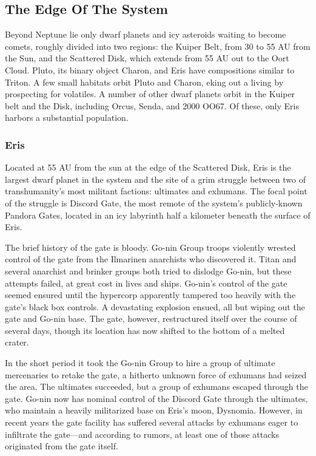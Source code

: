 \subsection{The Edge Of The System}

Beyond Neptune lie only dwarf planets and icy asteroids waiting to become comets, roughly divided into 
two regions: the Kuiper Belt, from 30 to 55 AU from 
the Sun, and the Scattered Disk, which extends from 
55 AU out to the Oort Cloud. Pluto, its binary object 
Charon, and Eris have compositions similar to Triton. 
A few small habitats orbit Pluto and Charon, eking 
out a living by prospecting for volatiles. A number of 
other dwarf planets orbit in the Kuiper belt and the 
Disk, including Orcus, Senda, and 2000 OO67. Of 
these, only Eris harbors a substantial population.

\subsubsection{Eris}

Located at 55 AU from the sun at the edge of the 
Scattered Disk, Eris is the largest dwarf planet in the 
system and the site of a grim struggle between two of 
transhumanity's most militant factions: ultimates and 
exhumans. The focal point of the struggle is Discord 
Gate, the most remote of the system's publicly-known 
Pandora Gates, located in an icy labyrinth half a kilometer beneath the surface of Eris. 

The brief history of the gate is bloody. Go-nin 
Group troops violently wrested control of the gate 
from the Ilmarinen anarchists who discovered it. Titan 
and several anarchist and brinker groups both tried 
to dislodge Go-nin, but these attempts failed, at great 
cost in lives and ships. Go-nin's control of the gate 
seemed ensured until the hypercorp apparently tampered too heavily with the gate's black box controls. 
A devastating explosion ensued, all but wiping out the 
gate and Go-nin base. The gate, however, restructured 
itself over the course of several days, though its location has now shifted to the bottom of a melted crater.

In the short period it took the Go-nin Group to hire 
a group of ultimate mercenaries to retake the gate, a 
hitherto unknown force of exhumans had seized the 
area. The ultimates succeeded, but a group of exhumans 
escaped through the gate. Go-nin now has nominal 
control of the Discord Gate through the ultimates, who 
maintain a heavily militarized base on Eris's moon, 
Dysnomia. However, in recent years the gate facility has 
suffered several attacks by exhumans eager to infiltrate 
the gate—and according to rumors, at least one of those 
attacks originated from the gate itself.


